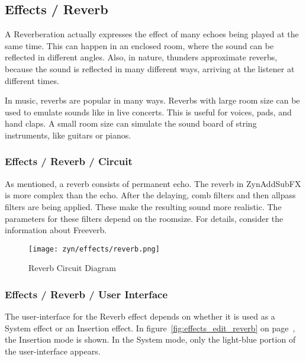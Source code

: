 

\subsection{Effects / Reverb}
\label{subsec:effects_edit_reverb}

   A Reverberation actually expresses the effect of many echoes being played
   at the same time. This can happen in an enclosed room, where the sound can
   be reflected in different angles. Also, in nature, thunders approximate
   reverbs, because the sound is reflected in many different ways, arriving
   at the listener at different times.

   In music, reverbs are popular in many ways. Reverbs with large room size
   can be used to emulate sounds like in live concerts. This is useful for
   voices, pads, and hand claps. A small room size can simulate the sound
   board of string instruments, like guitars or pianos.

\subsubsection{Effects / Reverb / Circuit}
\label{subsubsec:effects_edit_reverb_circuit}

   As mentioned, a reverb consists of permanent echo. The reverb in
   ZynAddSubFX is more complex than the echo. After the delaying, comb
   filters and then allpass filters are being applied. These make the
   resulting sound more realistic. The parameters for these filters depend on
   the roomsize. For details, consider the information about Freeverb.

\begin{figure}[H]
   \centering 
   \texttt{[image: zyn/effects/reverb.png]}
   \caption{Reverb Circuit Diagram}
   \label{fig:reverb_circuit_diagram}
\end{figure}

\subsubsection{Effects / Reverb / User Interface}
\label{subsubsec:effects_edit_reverb_ui}

   The user-interface for the Reverb effect depends on whether it is used as a
   System effect or an Insertion effect.
   In figure~\ref{fig:effects_edit_reverb} on
   page~\pageref{fig:effects_edit_reverb},
   the Insertion mode is shown.  In the System mode, only the light-blue
   portion of the user-interface appears.

